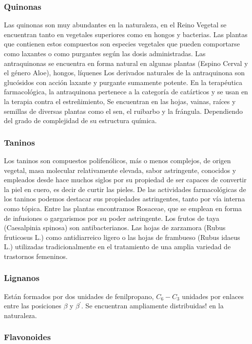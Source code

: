 \subsubsection{Quinonas}
Las quinonas son muy abundantes en la naturaleza, en el Reino Vegetal se encuentran tanto en vegetales superiores como en hongos y bacterias. Las plantas que contienen estos compuestos son especies vegetales que pueden comportarse como laxantes o como purgantes según las dosis administradas. Las antraquinonas se encuentra en forma natural en algunas plantas (Espino Cerval y el género Aloe), hongos, líquenes Los derivados naturales de la antraquinona son glucósidos con acción laxante y purgante sumamente potente. En la terapéutica farmacológica, la antraquinona pertenece a la categoría de catárticos y se usan en la terapia contra el estreñimiento, Se encuentran en las hojas, vainas, raíces y semillas de diversas plantas como el sen, el ruibarbo y la frángula. Dependiendo del grado de complejidad de su estructura química.
\subsubsection{Taninos}
Los taninos son compuestos polifenólicos, más o menos complejos, de origen vegetal, masa molecular relativamente elevada, sabor astringente, conocidos y empleados desde hace muchos siglos por su propiedad de ser capaces de convertir la piel en cuero, es decir de curtir las pieles. De las actividades farmacológicas de los taninos podemos destacar sus propiedades astringentes, tanto por vía interna como tópica. Entre las plantas encontramos Rosaceae, que se emplean en forma de infusiones o gargarismos por su poder astringente. Los frutos de taya (Caesalpinia spinosa) son antibacterianos. Las hojas de zarzamora (Rubus fruticosus L.) como antidiarreico ligero o las hojas de frambueso (Rubus idaeus L.) utilizadas tradicionalmente en el tratamiento de una amplia variedad de trastornos femeninos.
\subsubsection{Lignanos}
Están formados por dos unidades de fenilpropano, $C_6-C_3$ unidades por enlaces entre las posiciones $\beta$ y $\beta^{\prime}$. Se encuentran ampliamente distribuidas! en la naturaleza.

\subsubsection{Flavonoides}

